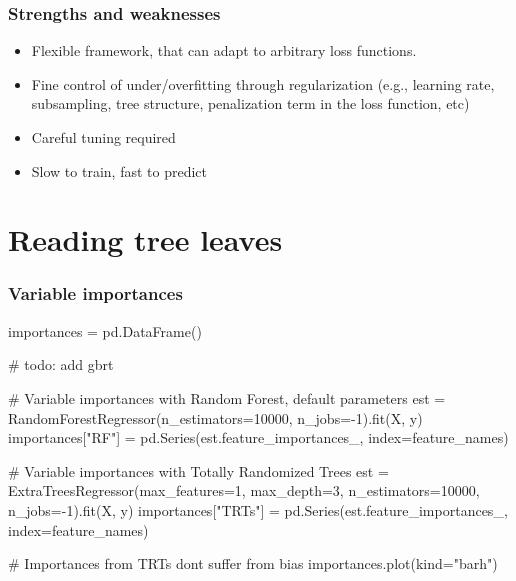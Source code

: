 \documentclass{beamer}
\begin{document}
\begin{frame}
  \frametitle{Strengths and weaknesses}

  \begin{itemize}
        \item {\color{blue} Flexible framework}, that can adapt to arbitrary loss functions.

        \vspace{0.25cm}

        \item Fine control of under/overfitting through {\color{blue} regularization} (e.g., learning rate, subsampling, tree structure, penalization term in the loss function, etc)

        \vspace{0.25cm}

        \item {\color{red} Careful tuning} required

        \vspace{0.25cm}

        \item {\color{red} Slow} to train, {\color{blue} fast} to predict
  \end{itemize}
\end{frame}




\section{Reading tree leaves}

\begin{frame}[fragile]
  \frametitle{Variable importances}

{\scriptsize
\begin{pythoncode}
importances = pd.DataFrame()

# todo: add gbrt

# Variable importances with Random Forest, default parameters
est = RandomForestRegressor(n_estimators=10000, n_jobs=-1).fit(X, y)
importances["RF"] = pd.Series(est.feature_importances_,
                              index=feature_names)

# Variable importances with Totally Randomized Trees
est = ExtraTreesRegressor(max_features=1, max_depth=3,
                          n_estimators=10000, n_jobs=-1).fit(X, y)
importances["TRTs"] = pd.Series(est.feature_importances_,
                                index=feature_names)

# Importances from TRTs dont suffer from bias
importances.plot(kind="barh")
\end{pythoncode}
}

\end{frame}
\end{document}
